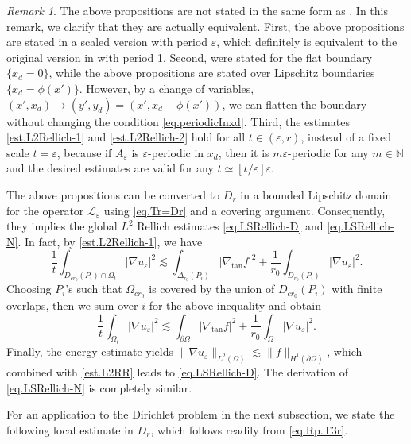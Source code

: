 \documentclass[reqno,12pt]{amsart} %
\theoremstyle{definition}
\theoremstyle{remark}
\newtheorem{remark}[theorem]{Remark}
\numberwithin{equation}{section}
\newcommand{\cL}{\mathcal{L}}
\newcommand{\N}{\mathbb{N}}
\newcommand{\e}{\varepsilon}
\begin{document}
\begin{remark}
 The above propositions are not stated in the same form as \cite[Lemmas 3.2, 3.4]{KS11}. In this remark, we clarify that they are actually equivalent. First, the above propositions are stated in a scaled version with period $\e$, which definitely is equivalent to the original version in \cite[Lemmas 3.2, 3.4]{KS11}  with period 1. Second,
    \cite[Lemma 3.2, 3.4]{KS11} were stated for the flat boundary $\{ x_d = 0 \}$, while the above propositions are stated over Lipschitz boundaries $\{x_d = \phi(x') \}$. However, by a change of variables, $(x', x_d) \to (y',y_d) = (x', x_d - \phi(x'))$, we can flatten the boundary without changing the condition \eqref{eq.periodicInxd}. Third, the estimates \eqref{est.L2Rellich-1} and \eqref{est.L2Rellich-2} hold for all $t \in (\e,r)$, instead of a fixed scale $t = \e$, because if $A_\e$ is $\e$-periodic in $x_d$, then it is $m\e$-periodic for any $m\in \N$ and the desired estimates are valid for any $t \simeq [t/\e]\e$.
\end{remark}

The above propositions can be converted to $D_r$ in a bounded Lipschitz domain for the operator $\cL_\e$ using \eqref{eq.Tr=Dr} and a covering argument. Consequently, they implies the global $L^2$ Rellich estimates \eqref{eq.LSRellich-D} and \eqref{eq.LSRellich-N}. In fact, by \eqref{est.L2Rellich-1}, we have
\begin{equation}
        \frac{1}{t} \int_{D_{cr_0}(P_i) \cap \Omega_t} |\nabla u_\e|^2 \lesssim \int_{\Delta_{r_0}(P_i)} |\nabla_{\tan} f|^2  + \frac{1}{r_0} \int_{D_{r_0}(P_i)} |\nabla u_\e|^2.
    \end{equation}
Choosing $P_i$'s such that $\Omega_{cr_0}$ is covered by the union of $D_{cr_0}(P_i)$ with finite overlaps, then we sum over $i$ for the above inequality and obtain
\begin{equation}\label{est.L2RR}
    \frac{1}{t}\int_{\Omega_t} |\nabla u_\e|^2 \lesssim \int_{\partial \Omega} |\nabla_{\tan} f|^2 + \frac{1}{r_0}\int_{\Omega} |\nabla u_\e|^2.
\end{equation}
Finally, the energy estimate yields $\| \nabla u_\e \|_{L^2(\Omega)} \lesssim \| f \|_{H^1(\partial \Omega)}$, which combined with \eqref{est.L2RR} leads to \eqref{eq.LSRellich-D}. The derivation of \eqref{eq.LSRellich-N} is completely similar.

For an application to the Dirichlet problem in the next subsection, we state the following local estimate in $D_r$, which follows readily from \eqref{eq.Rp.T3r}.
\end{document}
